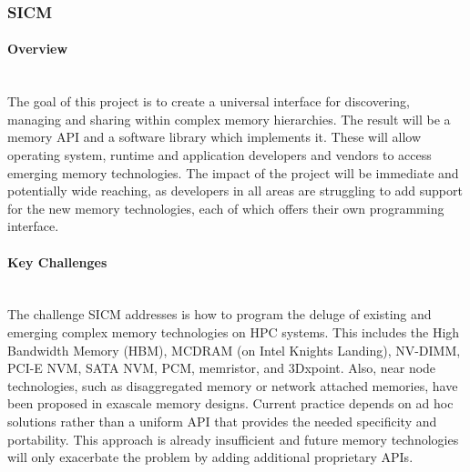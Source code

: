 \subsubsection{ SICM}
\paragraph{Overview} \leavevmode \\
The goal of this project is to create a universal interface for discovering, managing and sharing within complex memory hierarchies. The result will be a memory API and a software library which implements it. These will allow operating system, runtime and application developers and vendors to access emerging memory technologies. The impact of the project will be immediate and potentially wide reaching, as developers in all areas are struggling to add support for the new memory technologies, each of which offers their own programming interface. 

\paragraph{Key  Challenges} \leavevmode \\
The challenge SICM addresses is how to program the deluge of existing and emerging complex memory technologies on HPC systems. This includes the High Bandwidth Memory (HBM), MCDRAM (on Intel Knights Landing), NV-DIMM, PCI-E NVM, SATA NVM, PCM, memristor, and 3Dxpoint. Also, near node technologies, such as disaggregated memory or network attached memories, have been proposed in exascale memory designs. Current practice depends on ad hoc solutions rather than a uniform API that provides the needed specificity and portability. This approach is already insufficient and future memory technologies will only exacerbate the problem by adding additional proprietary APIs. 

